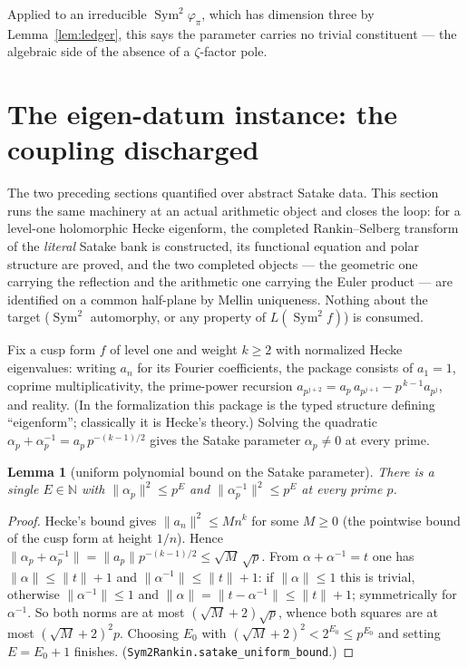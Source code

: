 \documentclass[11pt]{article}
\newtheorem{lemma}[theorem]{Lemma}
\newcommand{\Sym}{\operatorname{Sym}}
\begin{document}
Applied to an irreducible $\Sym^2\varphi_\pi$, which has dimension three by
Lemma~\ref{lem:ledger}, this says the parameter carries no trivial constituent --- the algebraic
side of the absence of a $\zeta$-factor pole.

\section{The eigen-datum instance: the coupling discharged}\label{sec:eigen}

The two preceding sections quantified over abstract Satake data.  This section runs the same
machinery at an actual arithmetic object and closes the loop: for a level-one holomorphic
Hecke eigenform, the completed Rankin--Selberg transform of the \emph{literal} Satake bank is
constructed, its functional equation and polar structure are proved, and the two completed
objects --- the geometric one carrying the reflection and the arithmetic one carrying the
Euler product --- are identified on a common half-plane by Mellin uniqueness.  Nothing about
the target ($\Sym^2$ automorphy, or any property of $L(\Sym^2 f)$) is consumed.

Fix a cusp form $f$ of level one and weight $k\ge2$ with normalized Hecke eigenvalues: writing
$a_n$ for its Fourier coefficients, the package consists of $a_1=1$, coprime multiplicativity,
the prime-power recursion $a_{p^{j+2}}=a_p\,a_{p^{j+1}}-p^{\,k-1}a_{p^j}$, and reality.  (In the
formalization this package is the typed structure defining ``eigenform''; classically it is
Hecke's theory.)  Solving the quadratic $\alpha_p+\alpha_p^{-1}=a_p\,p^{-(k-1)/2}$ gives the
Satake parameter $\alpha_p\ne0$ at every prime.

\begin{lemma}[uniform polynomial bound on the Satake parameter]\label{lem:satbound}
There is a single $E\in\mathbb N$ with $\|\alpha_p\|^2\le p^{E}$ and
$\|\alpha_p^{-1}\|^2\le p^{E}$ at every prime $p$.
\end{lemma}
\begin{proof}
Hecke's bound gives $\|a_n\|^2\le Mn^{k}$ for some $M\ge0$ (the pointwise bound of the cusp form
at height $1/n$).  Hence $\|\alpha_p+\alpha_p^{-1}\|=\|a_p\|p^{-(k-1)/2}\le\sqrt{M}\,\sqrt p$.
From $\alpha+\alpha^{-1}=t$ one has $\|\alpha\|\le\|t\|+1$ and $\|\alpha^{-1}\|\le\|t\|+1$: if
$\|\alpha\|\le1$ this is trivial, otherwise $\|\alpha^{-1}\|\le1$ and
$\|\alpha\|=\|t-\alpha^{-1}\|\le\|t\|+1$; symmetrically for $\alpha^{-1}$.  So both norms are at
most $(\sqrt M+2)\sqrt p$, whence both squares are at most $(\sqrt M+2)^2p$.  Choosing
$E_0$ with $(\sqrt M+2)^2<2^{E_0}\le p^{E_0}$ and setting $E=E_0+1$ finishes.
(\texttt{Sym2Rankin.satake\_uniform\_bound}.)
\end{proof}
\end{document}
